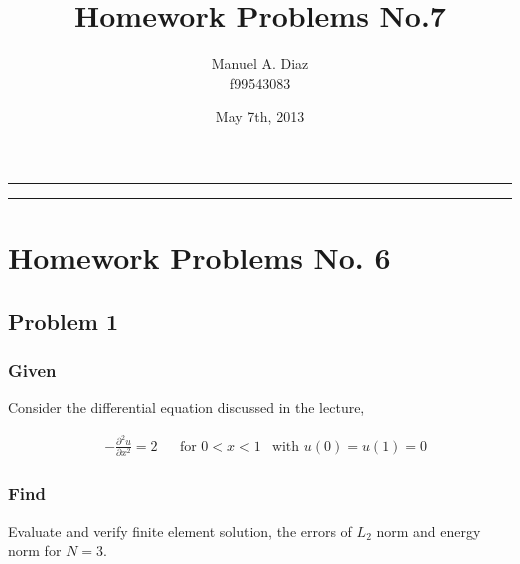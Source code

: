\documentclass[a4paper]{memoir}
\title{\huge \textbf{Homework Problems No.7}}
\author{Manuel A. Diaz \\ f99543083}
\date{May 7th, 2013} %
\begin{document}
\thispagestyle{empty}
\begin{center}{
\begin{shaded}
\hrule \vspace{30pt}
\hspace{30pt} \thetitle  \vspace{30pt}
\newline \theauthor \hspace{30pt} \thedate  \vspace{26pt}
\hrule
\end{shaded}
}
\end{center}
\clearpage


\pagestyle{Ruled}                    %
\midsloppy                             %


\checkandfixthelayout          %

\chapter{Homework Problems No. 6}
\section{Problem 1}
\subsection{Given}
Consider the differential equation discussed in the lecture,

\begin{align}
  &-\frac{\partial^2 u}{\partial x^2} = 2 & & \text{for } 0<x<1 	& \text{with } u(0)=u(1)=0
\end{align}

\subsection{Find}
Evaluate and verify finite element solution, the errors of $L_2$ norm and energy norm for $N=3$.
\end{document}
